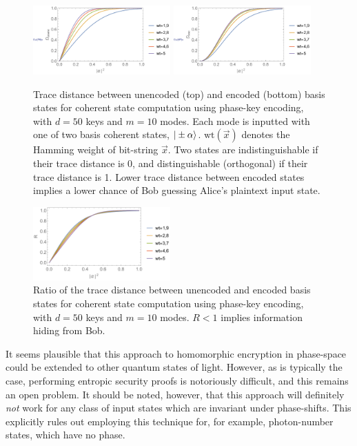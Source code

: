 \begin{figure}[!htb]
\includegraphics[width=0.47\textwidth]{coherent_state_homo_unenc}
\includegraphics[width=0.47\textwidth]{coherent_state_homo_enc}
\caption{Trace distance between unencoded (top) and encoded (bottom) basis states for coherent state computation using phase-key encoding, with \mbox{$d=50$} keys and \mbox{$m=10$} modes. Each mode is inputted with one of two basis coherent states, \mbox{$|\pm\alpha\rangle$}. \mbox{$\text{wt}(\vec{x})$} denotes the Hamming weight of bit-string $\vec{x}$. Two states are indistinguishable if their trace distance is 0, and distinguishable (orthogonal) if their trace distance is 1. Lower trace distance between encoded states implies a lower chance of Bob guessing Alice's plaintext input state.} \label{fig:homo_coh_st_tr}
\end{figure}

\begin{figure}[!htb]
\includegraphics[width=0.47\textwidth]{coherent_state_homo_ratio}
\caption{Ratio of the trace distance between unencoded and encoded basis states for coherent state computation using phase-key encoding, with \mbox{$d=50$} keys and \mbox{$m=10$} modes. \mbox{$R<1$} implies information hiding from Bob.} \label{fig:homo_coh_st_ratio}
\end{figure}

It seems plausible that this approach to homomorphic encryption in phase-space could be extended to other quantum states of light. However, as is typically the case, performing entropic security proofs is notoriously difficult, and this remains an open problem. It should be noted, however, that this approach will definitely \textit{not} work for any class of input states which are invariant under phase-shifts. This explicitly rules out employing this technique for, for example, photon-number states, which have no phase.

